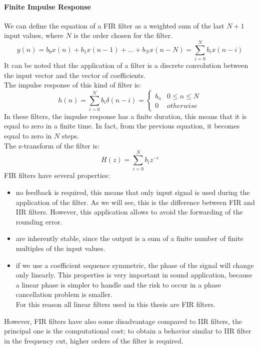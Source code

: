 \paragraph{Finite Impulse Response} 
We can define the equation of a FIR filter as a weighted sum of the last $N+1$ input values, where $N$ is the order chosen for the filter.
\begin{equation}
y(n) = b_0x(n) + b_1x(n-1) + ... + b_Nx(n-N) = \sum_{i=0}^N b_ix(n-i)
\end{equation}
It can be noted that the application of a filter is a discrete convolution between the input vector and the vector of coefficients.\\
The impulse response of this kind of filter is:
\begin{equation}
h(n) = \sum_{i=0}^N b_i \delta(n-i) = \begin{cases} b_n &\mbox{} 0\leq n \leq N \\ 
0 & \mbox{} otherwise \end{cases}
\end{equation} 
In these filters, the impulse response has a finite duration, this means that it is equal to zero in a finite time. In fact, from the previous equation, it becomes equal to zero in $N$ steps.\\
The z-transform of the filter is:
\begin{equation}
H(z) = \sum_{i=0}^N b_i z^{-i}
\end{equation}
FIR filters have several properties:
\begin{itemize}
\item no feedback is required, this means that only input signal is used during the application of the filter. As we will see, this is the difference between FIR and IIR filters. However, this application allows to avoid the forwarding of the rounding error.
\item are inherently stable, since the output is a sum of a finite number of finite multiples of the input values.
\item if we use a coefficient sequence symmetric, the phase of the signal will change only linearly. This properties is very important in sound application, because a linear phase is simpler to handle and the risk to occur in a phase cancellation problem is smaller.\\
For this reason all linear filters used in this thesis are FIR filters.
\end{itemize}
However, FIR filters have also some disadvantage compared to IIR filters, the principal one is the computational cost; to obtain a behavior similar to IIR filter in the frequency cut, higher orders of the filter is required.\\\\
